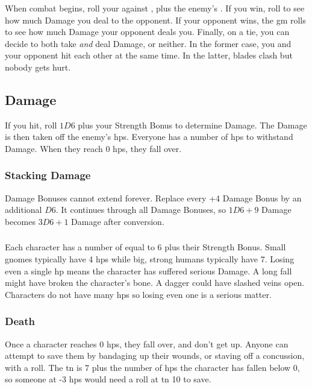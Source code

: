 \begin{multicols}{2}
When combat begins, roll your  against \tn[7], plus the enemy's .
If you win, roll to see how much Damage you deal to the opponent.
If your opponent wins, the \gls{gm} rolls to see how much Damage your opponent deals you.
Finally, on a tie, you can decide to both take \emph{and} deal Damage, or neither.
In the former case, you and your opponent hit each other at the same time.
In the latter, blades clash but nobody gets hurt.

\begin{figure*}[t!]
  \stackingDamageChart
\end{figure*}

\subsection{Damage}

If you hit, roll $1D6$ plus your Strength Bonus to determine Damage.
The Damage is then taken off the enemy's \glspl{hp}.
Everyone has a number of \glspl{hp} to withstand Damage.
When they reach 0 \glspl{hp}, they fall over.

\subsubsection{Stacking Damage}
\label{stackingDamage}

Damage Bonuses cannot extend forever.
Replace every +4 Damage Bonus by an additional $D6$.
It continues through all Damage Bonuses, so $1D6+9$ Damage becomes $3D6+1$ Damage after conversion.

\subsubsection{}

Each character has a number of  equal to 6 plus their Strength Bonus.
Small gnomes typically have 4 \glspl{hp} while big, strong humans typically have 7.
Losing even a single \gls{hp} means the character has suffered serious Damage.
A long fall might have broken the character's bone.
A dagger could have slashed veins open.
Characters do not have many \glspl{hp} so losing even one is a serious matter.

\subsubsection{Death}
\label{death}
Once a character reaches 0 \glspl{hp}, they fall over, and don't get up.
Anyone can attempt to save them by bandaging up their wounds, or staving off a concussion, with a  roll.
The \gls{tn} is 7 plus the number of \glspl{hp} the character has fallen below 0, so someone at -3 \glspl{hp} would need a roll at \gls{tn} 10 to save.


\end{multicols}

